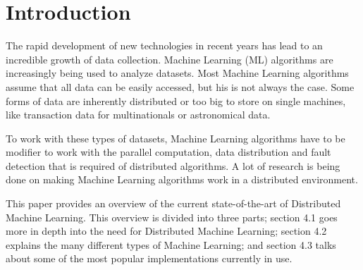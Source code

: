 \section{Introduction}


The rapid development of new technologies in recent years has lead to an incredible growth of data collection. Machine Learning (ML) algorithms are increasingly being used to analyze datasets. Most Machine Learning algorithms assume that all data can be easily accessed, but his is not always the case. Some forms of data are inherently distributed or too big to store on single machines, like transaction data for multinationals or astronomical data.

To work with these types of datasets, Machine Learning algorithms have to be modifier to work with the parallel computation, data distribution and fault detection that is required of distributed algorithms. A lot of research is being done on making Machine Learning algorithms work in a distributed environment.

This paper provides an overview of the current state-of-the-art of Distributed Machine Learning. This overview is divided into three parts; section 4.1 goes more in depth into the need for Distributed Machine Learning; section 4.2 explains the many different types of Machine Learning; and section 4.3 talks about some of the most popular implementations currently in use. %

